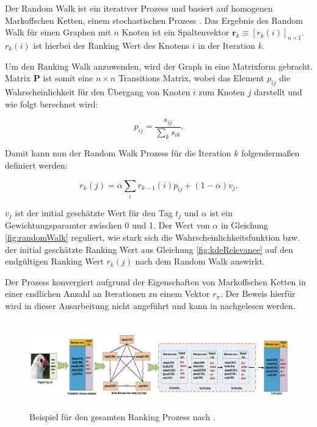 Der Random Walk ist ein iterativer Prozess und basiert auf homogenen Markoffschen Ketten, einem stochastischen Prozess \cite{bronstein}. Das Ergebnis des Random Walk für einen Graphen mit $n$ Knoten ist ein Spaltenvektor $\textbf{r}_k \equiv [r_k(i)]_{n \times 1}$. $r_k(i)$ ist hierbei der Ranking Wert des Knotens $i$ in der Iteration $k$. 

Um den Ranking Walk anzuwenden, wird der Graph in eine Matrixform gebracht. Matrix \textbf{P} ist somit eine $n \times n$ Transitions Matrix, wobei das Element $p_{ij}$ die Wahrscheinlichkeit für den Übergang von Knoten $i$ zum Knoten $j$ darstellt und wie folgt berechnet wird:
\begin{figure}[hptb]
  \begin{equation}
  \label{fig:probabilityScore}
    p_{ij} = \frac{s_{ij}}{\sum_k s_{ik}}.
  \end{equation}
\end{figure}

Damit kann nun der Random Walk Prozess für die Iteration $k$ folgendermaßen definiert werden:
\begin{figure}[hptb]
  \begin{equation}
  \label{fig:randomWalk}
    r_k(j) = \alpha \sum_i r_{k-1}(i)p_{ij} + (1 - \alpha)v_j.
  \end{equation}
\end{figure}

$v_j$ ist der initial geschätzte Wert für den Tag $t_j$ und $\alpha$ ist ein Gewichtungsparamter zwischen 0 und 1. Der Wert von $\alpha$ in Gleichung \ref{fig:randomWalk} reguliert, wie stark sich die Wahrscheinlichkeitsfunktion bzw. der initial geschätzte Ranking Wert aus Gleichung \ref{fig:kdeRelevance} auf den endgültigen Ranking Wert $r_k(j)$ nach dem Random Walk auswirkt.

Der Prozess konvergiert aufgrund der Eigenschaften von Markoffschen Ketten in einer endlichen Anzahl an Iterationen zu einem Vektor $r_\pi$. Der Beweis hierfür wird in dieser Ausarbeitung nicht angeführt und kann in \cite{ranking} nachgelesen werden.


\begin{figure}[htbp]
  \centering
    \includegraphics[height=1.5in]{images/example_of_random_walk.png}
  \caption{Beispiel für den gesamten Ranking Prozess nach \cite{ranking}.}
  \label{fig:randomWalkExample}
\end{figure}


